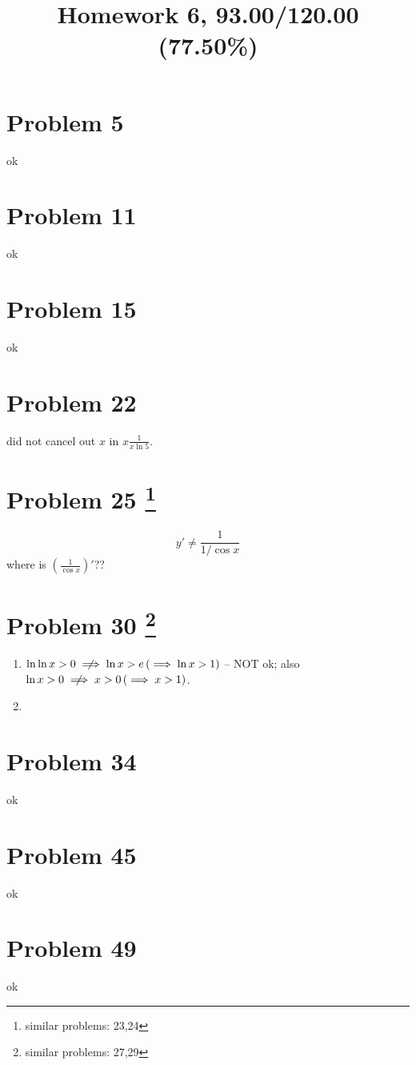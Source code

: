 \documentclass[10pt]{article} %
\title{Homework 6,
93.00/120.00 (77.50\%)
}
\begin{document}
\maketitle

\section*{Problem 5 }
ok
\section*{Problem 11 }
ok
\section*{Problem 15 }
ok
\section*{Problem 22 }
did not cancel out $x$ in $\displaystyle x\frac{1}{x\ln 5}$.
\section*{Problem 25 \footnote{similar problems: 23,24}}
\begin{equation*}
	y'\neq\frac{1}{1/\cos x}
\end{equation*}
where is $\displaystyle\left( \frac{1}{\cos x} \right)'$??
\section*{Problem 30  \footnote{similar problems: 27,29}}
\begin{enumerate}[I]
	\item $\ln\ln x>0 \centernot\implies \ln x>e \left( \implies \ln x>1 \right)$ -- NOT ok; also 
		$\ln x>0\centernot\implies  x>0 \left( \implies x>1 \right)$.
	\item 
\end{enumerate}
\section*{Problem 34 }
ok
\section*{Problem 45 }
ok
\section*{Problem 49 }
ok
\end{document}
